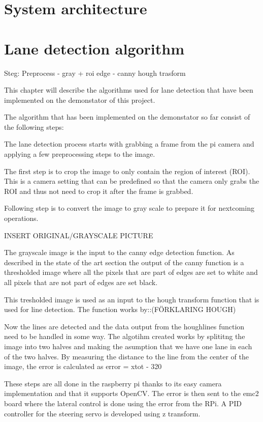 \section{System architecture}


\section{Lane detection algorithm}


Steg: Preprocess - gray + roi
edge - canny
hough trasform


This chapter will describe the algorithms used for lane detection that have been implemented on the demonstator of this project. 

The algorithm that has been implemented on the demonstator so far consist of the following steps:

The lane detection process starts with grabbing a frame from the pi camera and applying a few preprocessing steps to the image. 

The first step is to crop the image to only contain the region of interest (ROI). This is a camera setting that can be predefined so that the camera only grabs the ROI and thus not need to crop it after the frame is grabbed.


Following step is to convert the image to gray scale to prepare it for nextcoming operations. 



INSERT ORIGINAL/GRAYSCALE PICTURE


The grayscale image is the input to the canny edge detection function. As described in the state of the art section the output of the canny function is a thresholded image where all the pixels that are part of edges are set to white and all pixels that are not part of edges are set black.

This tresholded image is used as an input to the hough transform function that is used for line detection. The function works by::(FÖRKLARING HOUGH)

Now the lines are detected and the data  output from the houghlines function need to be handled in some way. 
The algotihm created works by splititng the image into two halves and making the asumption that we have one lane in each of the two halves. By measuring the distance to the line from the center of the image, the error is calculated as error = xtot - 320


These steps are all done in the raspberry pi thanks to its easy camera implementation and that it supports OpenCV. The error is then sent to the emc2 board where the lateral control is done using the error from the RPi. A PID controller for the steering servo is developed using z transform.




